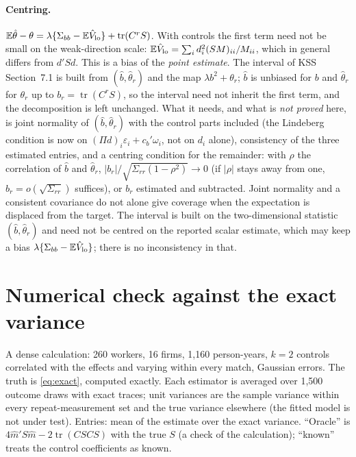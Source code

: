 \documentclass[11pt]{article}
\newcommand{\E}{\mathbb{E}}
\newcommand{\tr}{\operatorname{tr}}
\begin{document}
\paragraph{Centring.} $\E\hat\theta-\theta=\lambda\{\Sigma_{bb}-\E\hat V_{\rm lo}\}+\tr(C^rS)$. With controls the first
term need not be small on the weak-direction scale: $\E\hat V_{\rm lo}=\sum_id_i^2(SM)_{ii}/M_{ii}$, which in general
differs from $d'Sd$. This is a bias of the \emph{point estimate}. The interval of KSS Section~7.1 is built from
$(\hat b,\hat\theta_r)$ and the map $\lambda b^2+\theta_r$; $\hat b$ is unbiased for $b$ and $\hat\theta_r$ for
$\theta_r$ up to $b_r=\tr(C^rS)$, so the interval need not inherit the first term, and the decomposition is left
unchanged. What it needs, and what is \emph{not proved} here, is joint normality of $(\hat b,\hat\theta_r)$ with the
control parts included (the Lindeberg condition is now on $(\Pi d)_i\varepsilon_i+c_b'\omega_i$, not on $d_i$ alone),
consistency of the three estimated entries, and a centring condition for the remainder: with $\rho$ the correlation
of $\hat b$ and $\hat\theta_r$, $|b_r|/\sqrt{\Sigma_{rr}(1-\rho^2)}\to0$ (if $|\rho|$ stays away from one,
$b_r=o(\sqrt{\Sigma_{rr}})$ suffices), or $b_r$ estimated and subtracted. Joint normality and a consistent covariance
do not alone give coverage when the expectation is displaced from the target. The interval is built on the
two-dimensional statistic $(\hat b,\hat\theta_r)$ and need not be centred on the reported scalar estimate, which may
keep a bias $\lambda\{\Sigma_{bb}-\E\hat V_{\rm lo}\}$; there is no inconsistency in that.

\section{Numerical check against the exact variance}\label{sec:num}
A dense calculation: 260 workers, 16 firms, 1{,}160 person-years, $k=2$ controls correlated with the effects and
varying within every match, Gaussian errors. The truth is \eqref{eq:exact}, computed exactly. Each estimator is
averaged over 1{,}500 outcome draws with exact traces; unit variances are the sample variance within every
repeat-measurement set and the true variance elsewhere (the fitted model is not under test). Entries: mean of the
estimate over the exact variance. ``Oracle'' is $4\hat m'S\hat m-2\tr(CSCS)$ with the true $S$ (a check of the
calculation); ``known'' treats the control coefficients as known.
\end{document}
